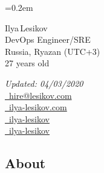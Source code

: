 \documentclass[11pt, a4paper]{article}
\newcommand{\Delimitline}{
  \vspace{-2ex}
  \noindent\makebox[\linewidth]{\rule{\DelimitlineLength}{0.12ex}} }
\begin{document}
\sffamily

\font=0.2em

\newlength{\DelimitlineLength}
\setlength{\DelimitlineLength}{\textwidth+1em}

\pagecolor[RGB]{245,245,245}


{\setlength\multicolsep{0pt}\begin{multicols}{2}
    \begin{spacing}{1.6}\raggedright\rmfamily
    {\huge \vphantom{Name: }Ilya\,Lesikov}\\[1.8ex]
    {\Large \vphantom{Title: }DevOps Engineer/SRE}\\
    {\Large \vphantom{Location: }Russia, Ryazan (UTC+3)}\\
    {\Large \vphantom{Age: }27 years old}
  \end{spacing}

  \columnbreak

  \begin{flushright}\begin{spacing}{1.3}\rmfamily
    \textit{Updated: 04/03/2020}\\[0.5ex]
    \large{
      \vphantom{contacts, contact information: }
      \faEnvelope \href{mailto:hire@lesikov.com}{\vphantom{Email: }\ hire@lesikov.com}\\
      \faInternetExplorer \href{https://ilya-lesikov.com}{\vphantom{Website: }\ ilya-lesikov.com}\\
      \faLinkedin \href{https://www.linkedin.com/in/ilya-lesikov}{\vphantom{LinkedIn: }\ ilya-lesikov}\\
      \faGithubAlt \href{https://github.com/ilya-lesikov}{\vphantom{GitHub: }\ ilya-lesikov}}
  \end{spacing}\end{flushright}
\end{multicols}}

\vspace{2ex}


\subsection*{About\vphantom{ (professional summary)}}
\Delimitline
\end{document}
